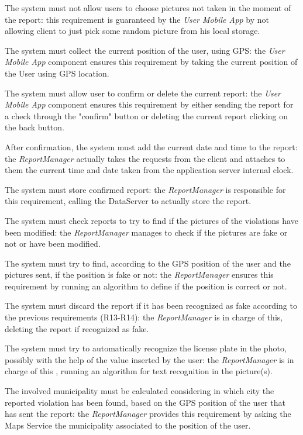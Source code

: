 \documentclass[a4paper]{report}
\begin{document}
\begin{enumerate}[start=1,label={[R\arabic*]}]
\item \label{[R8]}The system must not allow users to choose pictures not taken in the moment of the report: this requirement is guaranteed by the \textit{User Mobile App} by not allowing client to just pick some random picture from his local storage.
\item \label{[R9]}The system must collect the current position of the user, using GPS: the \textit{User Mobile App} component ensures this requirement by taking the current position of the User using GPS location.
\item \label{[R10]}The system must allow user to confirm or delete the current report: the \textit{User Mobile App} component ensures this requirement by either sending the report for a check through the "confirm" button or deleting the current report clicking on the back button.
\item\label{[R11]} After confirmation, the system must add the current date and time to the report: the \textit{ReportManager} actually takes the requests from the client and attaches to them the current time and date taken from the application server internal clock.
\item \label{[R12]}The system must store confirmed report: the \textit{ReportManager} is responsible for this requirement, calling the DataServer to actually store the report.
\item \label{[R13]}The system must check reports to try to find if the pictures of the violations have been modified: the \textit{ReportManager} manages to check if the pictures are fake or not or have been modified.
\item \label{[R14]}The system must try to find, according to the GPS position of the user and the pictures sent, if the position is fake or not: the \textit{ReportManager} ensures this requirement by running an algorithm to define if the position is correct or not. 
\item \label{[R15]}The system must discard the report if it has been recognized as fake according to the previous requirements (R13-R14): the \textit{ReportManager} is in charge of this, deleting the report if recognized as fake.
\item \label{[R16]}The system must try to automatically recognize the license plate in the photo, possibly with the help of the value inserted by the user: the \textit{ReportManager} is in charge of this , running an algorithm for text recognition in the picture(s).
\item \label{[R17]}The involved municipality must be calculated considering in which city the reported violation has been found, based on the GPS position of the user that has sent the report: the \textit{ReportManager} provides this requirement by asking the Maps Service the municipality associated to the position of the user.

\end{enumerate}
\end{document}
